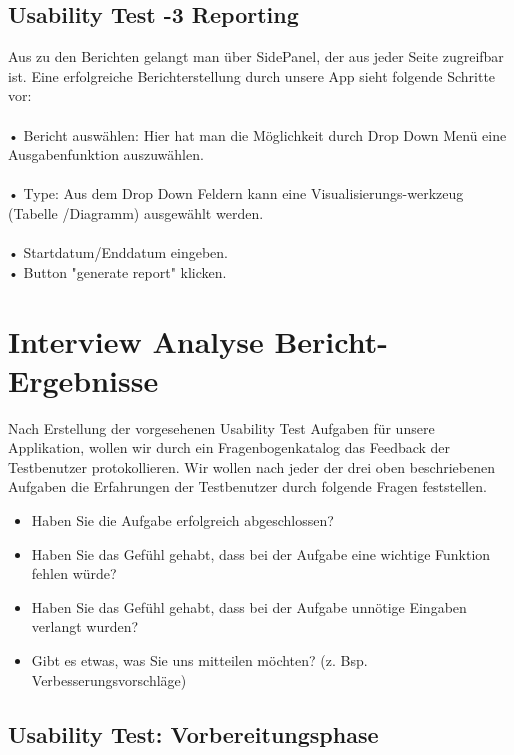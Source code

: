 \documentclass[runningheads,a4paper]{llncs}
\begin{document}
\subsection{Usability Test -3 Reporting}
Aus zu den Berichten gelangt man über SidePanel,  der aus jeder Seite zugreifbar ist. Eine erfolgreiche Berichterstellung durch unsere App sieht folgende Schritte vor:\\\\
•	Bericht auswählen: Hier hat man die Möglichkeit durch Drop Down Menü eine Ausgabenfunktion auszuwählen.\\\\
•	Type: Aus dem Drop Down Feldern kann eine Visualisierungs-werkzeug (Tabelle /Diagramm) ausgewählt werden.\\\\
•	Startdatum/Enddatum eingeben.\\
•	Button "generate report" klicken.\\


\section{Interview Analyse Bericht-Ergebnisse}

Nach Erstellung der vorgesehenen Usability Test Aufgaben für unsere Applikation, wollen wir durch ein Fragenbogenkatalog das Feedback der Testbenutzer  protokollieren.  Wir wollen nach jeder der drei oben beschriebenen Aufgaben  die Erfahrungen der Testbenutzer durch folgende Fragen feststellen.\\

\begin{itemize}
\item Haben Sie die Aufgabe erfolgreich abgeschlossen?\\
\item Haben Sie das Gefühl gehabt, dass bei der Aufgabe eine wichtige Funktion fehlen würde?\\
\item Haben Sie das Gefühl gehabt, dass bei der Aufgabe unnötige Eingaben verlangt wurden?\\
\item Gibt es etwas, was Sie uns mitteilen möchten? (z. Bsp. Verbesserungsvorschläge)\\
\end {itemize}


\subsection{Usability Test: Vorbereitungsphase}
\end{document}

